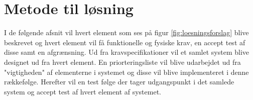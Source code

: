 \section{Metode til løsning}\label{metode_loesningsforslag}

I de følgende afsnit vil hvert element som ses på figur \ref{fig:loesningsforslag} blive beskrevet og hvert element vil få funktionelle og fysiske krav, en accept test af disse samt en afgrænsning. Ud fra kravspecifikationer vil et samlet system blive designet ud fra hvert element. En priorteringsliste vil blive udarbejdet ud fra "vigtigheden" af elementerne i systemet og disse vil blive implementeret i denne rækkefølge. Herefter vil en test følge der tager udgangspunkt i det samlede system og accept test af hvert element af systemet. 

